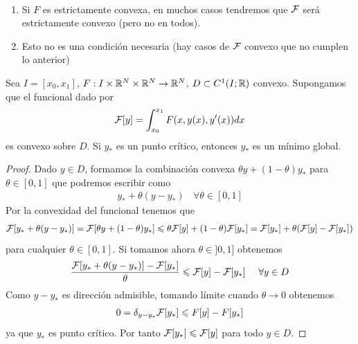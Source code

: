 \begin{observacion}\
    \begin{enumerate}
        \item Si $F$ es estrictamente convexa, en muchos casos tendremos que $\mathcal{F}$ será estrictamente convexo (pero no en todos).
        \item Esto no es una condición necesaria (hay casos de $\mathcal{F}$ convexo que no cumplen lo anterior)
    \end{enumerate}
\end{observacion}

\begin{prop}
    Sea $I=[x_0,x_1]$, $F:I\times \mathbb{R}^N\times \mathbb{R}^N\to \mathbb{R}^N$, $D\subset C^1(I;\mathbb{R})$ convexo. Supongamos que el funcional dado por 
    \begin{gather*}
        \mathcal{F}[y] = \int_{x_0}^{x_1} F(x,y(x),y'(x)) dx
    \end{gather*}
    es convexo sobre $D$. Si $y_*$ es un punto crítico, entonces $y_*$ es un mínimo global.

    \begin{proof}
        Dado $y\in D$, formamos la combinación convexa $\theta y + (1-\theta) y_*$ para $\theta\in [0,1]$ que podremos escribir como 
        \begin{gather*}
            y_* + \theta(y-y_*) \ \ \ \ \forall \theta \in [0,1]
        \end{gather*}
        Por la convexidad del funcional tenemos que 
        \begin{gather*}
            \mathcal{F}[y_* + \theta(y-y_*)] = \mathcal{F}[\theta y + (1-\theta)y_*] \leqslant \theta \mathcal{F}[y] + (1-\theta)\mathcal{F}[y_*] = \mathcal{F}[y_*] + \theta(\mathcal{F}[y] - \mathcal{F}[y_*])
        \end{gather*}
        para cualquier $\theta \in [0,1]$. Si tomamos ahora $\theta \in ]0,1]$ obtenemos 
        \begin{gather*}
            \frac{\mathcal{F}[y_* + \theta(y-y_*)] - \mathcal{F}[y_*]}{\theta} \leqslant \mathcal{F}[y] - \mathcal{F}[y_*] \ \ \ \ \forall y\in D
        \end{gather*}
        Como $y-y_*$ es dirección admisible, tomando límite cuando $\theta\to 0$ obtenemos 
        \begin{gather*}
            0 = \delta_{y-y_*} \mathcal{F}[y_*] \leqslant F[y] - F[y_*]
        \end{gather*}
        ya que $y_*$ es punto crítico. Por tanto $\mathcal{F}[y_*]\leqslant \mathcal{F}[y]$ para todo $y\in D$.
    \end{proof}
\end{prop}

